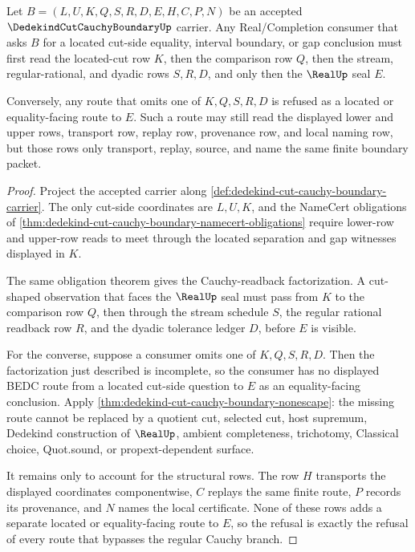 \begin{theorem}
\label{thm:dedekind-cut-cauchy-boundary-located-refusal}
Let $B=(L,U,K,Q,S,R,D,E,H,C,P,N)$ be an accepted $\DedekindCutCauchyBoundaryUp$ carrier. Any Real/Completion consumer that asks $B$ for a located cut-side equality, interval boundary, or gap conclusion must first read the located-cut row $K$, then the comparison row $Q$, then the stream, regular-rational, and dyadic rows $S,R,D$, and only then the $\RealUp$ seal $E$.

Conversely, any route that omits one of $K,Q,S,R,D$ is refused as a located or equality-facing route to $E$. Such a route may still read the displayed lower and upper rows, transport row, replay row, provenance row, and local naming row, but those rows only transport, replay, source, and name the same finite boundary packet.
\end{theorem}
\begin{proof}
Project the accepted carrier along \autoref{def:dedekind-cut-cauchy-boundary-carrier}. The only cut-side coordinates are $L,U,K$, and the NameCert obligations of \autoref{thm:dedekind-cut-cauchy-boundary-namecert-obligations} require lower-row and upper-row reads to meet through the located separation and gap witnesses displayed in $K$.

The same obligation theorem gives the Cauchy-readback factorization. A cut-shaped observation that faces the $\RealUp$ seal must pass from $K$ to the comparison row $Q$, then through the stream schedule $S$, the regular rational readback row $R$, and the dyadic tolerance ledger $D$, before $E$ is visible.

For the converse, suppose a consumer omits one of $K,Q,S,R,D$. Then the factorization just described is incomplete, so the consumer has no displayed BEDC route from a located cut-side question to $E$ as an equality-facing conclusion. Apply \autoref{thm:dedekind-cut-cauchy-boundary-nonescape}: the missing route cannot be replaced by a quotient cut, selected cut, host supremum, Dedekind construction of $\RealUp$, ambient completeness, trichotomy, Classical choice, Quot.sound, or propext-dependent surface.

It remains only to account for the structural rows. The row $H$ transports the displayed coordinates componentwise, $C$ replays the same finite route, $P$ records its provenance, and $N$ names the local certificate. None of these rows adds a separate located or equality-facing route to $E$, so the refusal is exactly the refusal of every route that bypasses the regular Cauchy branch.
\end{proof}


